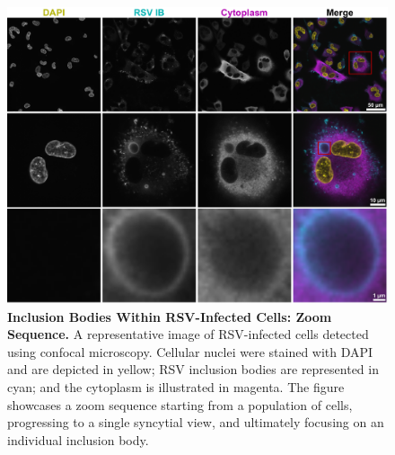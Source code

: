 \begin{figure}
    \centering
    \includegraphics[width=1\linewidth]{08. Chapter 3/Figs/01. Localisation introduction/01. IB-zooms.pdf}
    \caption[Inclusion Bodies Within RSV-Infected Cells: Zoom Sequence.]{\textbf{Inclusion Bodies Within RSV-Infected Cells: Zoom Sequence.} A representative image of RSV-infected cells detected using confocal microscopy. Cellular nuclei were stained with DAPI and are depicted in yellow; RSV inclusion bodies are represented in cyan; and the cytoplasm is illustrated in magenta. The figure showcases a zoom sequence starting from a population of cells, progressing to a single syncytial view, and ultimately focusing on an individual inclusion body.}
    \label{fig:Inclusion Bodies Within RSV Infected Cells: Zoom Sequence}
\end{figure}

